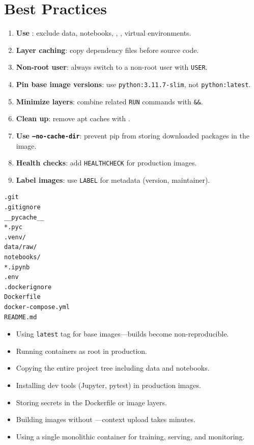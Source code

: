\section{Best Practices}
\label{sec:docker-best-practices}

\begin{bestpractice}[title=\textbf{Docker best practices for ML}]
\begin{enumerate}
  \item \textbf{Use }: exclude data, notebooks,
    , , virtual environments.
  \item \textbf{Layer caching}: copy dependency files before source code.
  \item \textbf{Non-root user}: always switch to a non-root user with
    \texttt{USER}.
  \item \textbf{Pin base image versions}: use
    \texttt{python:3.11.7-slim}, not \texttt{python:latest}.
  \item \textbf{Minimize layers}: combine related \texttt{RUN}
    commands with \texttt{\&\&}.
  \item \textbf{Clean up}: remove apt caches with
    .
  \item \textbf{Use \texttt{--no-cache-dir}}: prevent pip from storing
    downloaded packages in the image.
  \item \textbf{Health checks}: add \texttt{HEALTHCHECK} for
    production images.
  \item \textbf{Label images}: use \texttt{LABEL} for metadata
    (version, maintainer).
\end{enumerate}
\end{bestpractice}

\begin{codeblock}[title=\textbf{.dockerignore}]
\begin{verbatim}
.git
.gitignore
__pycache__
*.pyc
.venv/
data/raw/
notebooks/
*.ipynb
.env
.dockerignore
Dockerfile
docker-compose.yml
README.md
\end{verbatim}
\end{codeblock}

\begin{antipattern}[title=\textbf{Docker anti-patterns for ML}]
\begin{itemize}
  \item Using \texttt{latest} tag for base images---builds become
    non-reproducible.
  \item Running containers as root in production.
  \item Copying the entire project tree including data and notebooks.
  \item Installing dev tools (Jupyter, pytest) in production images.
  \item Storing secrets in the Dockerfile or image layers.
  \item Building images without ---context upload
    takes minutes.
  \item Using a single monolithic container for training, serving, and
    monitoring.
\end{itemize}
\end{antipattern}

